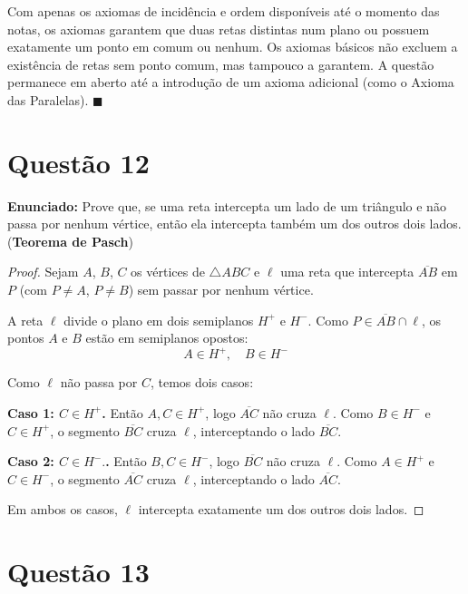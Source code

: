 \documentclass[12pt,a4paper]{article}
\begin{document}
Com apenas os axiomas de incid\^encia e ordem dispon\'iveis at\'e o momento das notas, os axiomas garantem que duas retas distintas num plano ou possuem exatamente um ponto em comum ou nenhum. Os axiomas b\'asicos n\~ao excluem a exist\^encia de retas sem ponto comum, mas tampouco a garantem. A quest\~ao permanece em aberto at\'e a introdu\c{c}\~ao de um axioma adicional (como o Axioma das Paralelas). $\blacksquare$

\section*{Quest\~ao 12}

\textbf{Enunciado:} Prove que, se uma reta intercepta um lado de um tri\^angulo e n\~ao passa por nenhum v\'ertice, ent\~ao ela intercepta tamb\'em um dos outros dois lados. (\textbf{Teorema de Pasch})

\begin{proof}
Sejam $A$, $B$, $C$ os v\'ertices de $\triangle ABC$ e $\ell$ uma reta que intercepta $\overline{AB}$ em $P$ (com $P \neq A$, $P \neq B$) sem passar por nenhum v\'ertice.

A reta $\ell$ divide o plano em dois semiplanos $H^+$ e $H^-$. Como $P \in \overline{AB} \cap \ell$, os pontos $A$ e $B$ est\~ao em semiplanos opostos:
$$A \in H^+, \quad B \in H^-$$

Como $\ell$ n\~ao passa por $C$, temos dois casos:

\textbf{Caso 1: $C \in H^+$.} Ent\~ao $A, C \in H^+$, logo $\overline{AC}$ n\~ao cruza $\ell$. Como $B \in H^-$ e $C \in H^+$, o segmento $\overline{BC}$ cruza $\ell$, interceptando o lado $\overline{BC}$.

\textbf{Caso 2: $C \in H^-.$.} Ent\~ao $B, C \in H^-$, logo $\overline{BC}$ n\~ao cruza $\ell$. Como $A \in H^+$ e $C \in H^-$, o segmento $\overline{AC}$ cruza $\ell$, interceptando o lado $\overline{AC}$.

Em ambos os casos, $\ell$ intercepta exatamente um dos outros dois lados.
\end{proof}

\section*{Quest\~ao 13}
\end{document}
